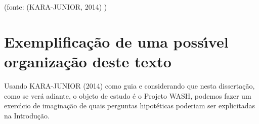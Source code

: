 \documentclass[
12pt,		%
openright,	%
twoside,  %
a4paper,			%
chapter=TITLE,		%
english,			%
french,				%
spanish,			%
brazil				%
]{USPSC-classe/USPSC}
\begin{document}
\begin{flushright}
\setlength{\absparsep}{0pt}
\tiny \begin{flushright}
\setlength{\absparsep}{0pt}
\tiny \begin{flushright}
\setlength{\absparsep}{0pt}
\tiny \begin{flushright}
\setlength{\absparsep}{0pt}
\tiny \begin{flushright}
\setlength{\absparsep}{0pt}
\tiny \begin{flushright}
\setlength{\absparsep}{0pt}
\tiny \begin{flushright}
\setlength{\absparsep}{0pt}
\tiny \begin{flushright}
\setlength{\absparsep}{0pt}
\tiny \begin{flushright}
\setlength{\absparsep}{0pt}
\tiny \begin{flushright}
\setlength{\absparsep}{0pt}
\tiny (fonte:  (KARA-JUNIOR, 2014) ) \normalsize 
\end{flushright}

 \normalsize 
\end{flushright}

 \normalsize 
\end{flushright}

 \normalsize 
\end{flushright}

 \normalsize 
\end{flushright}

 \normalsize 
\end{flushright}

 \normalsize 
\end{flushright}

 \normalsize 
\end{flushright}

 \normalsize 
\end{flushright}

 \normalsize 
\end{flushright}


\section[Exemplifica\c{c}\~ao de uma poss\'{\i}vel organiza\c{c}\~ao deste texto]{Exemplifica\c{c}\~ao de uma poss\'{\i}vel organiza\c{c}\~ao deste texto}\label{Exemplifica\c{c}\~ao de uma poss\'{\i}vel organiza\c{c}\~ao deste texto}
Usando  KARA-JUNIOR (2014) como guia e considerando que nesta disserta\c{c}\~ao, como se ver\'a adiante, o objeto de estudo \'e o Projeto WASH, podemos fazer um exerc\'{\i}cio de imagina\c{c}\~ao de quais perguntas hipot\'eticas poderiam ser explicitadas na Introdu\c{c}\~ao.
\end{document}
